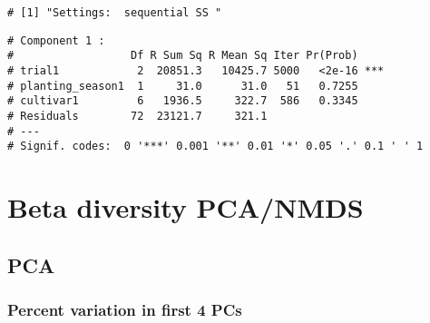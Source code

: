 \documentclass[
]{article}
\newenvironment{Shaded}{\begin{snugshade}}{\end{snugshade}}
\newcommand{\AttributeTok}[1]{\textcolor[rgb]{0.77,0.63,0.00}{#1}}
\newcommand{\CommentTok}[1]{\textcolor[rgb]{0.56,0.35,0.01}{\textit{#1}}}
\newcommand{\DecValTok}[1]{\textcolor[rgb]{0.00,0.00,0.81}{#1}}
\newcommand{\FunctionTok}[1]{\textcolor[rgb]{0.00,0.00,0.00}{#1}}
\newcommand{\NormalTok}[1]{#1}
\newcommand{\OtherTok}[1]{\textcolor[rgb]{0.56,0.35,0.01}{#1}}
\newcommand{\SpecialCharTok}[1]{\textcolor[rgb]{0.00,0.00,0.00}{#1}}
\newcommand{\StringTok}[1]{\textcolor[rgb]{0.31,0.60,0.02}{#1}}
\begin{document}
\begin{verbatim}
# [1] "Settings:  sequential SS "
\end{verbatim}

\begin{verbatim}
# Component 1 :
#                  Df R Sum Sq R Mean Sq Iter Pr(Prob)    
# trial1            2  20851.3   10425.7 5000   <2e-16 ***
# planting_season1  1     31.0      31.0   51   0.7255    
# cultivar1         6   1936.5     322.7  586   0.3345    
# Residuals        72  23121.7     321.1                  
# ---
# Signif. codes:  0 '***' 0.001 '**' 0.01 '*' 0.05 '.' 0.1 ' ' 1
\end{verbatim}

\hypertarget{beta-diversity-pcanmds-1}{%
\section{Beta diversity PCA/NMDS}\label{beta-diversity-pcanmds-1}}

\hypertarget{pca-1}{%
\subsection{PCA}\label{pca-1}}

\begin{Shaded}
\end{Shaded}

\hypertarget{percent-variation-in-first-4-pcs-1}{%
\subsubsection{Percent variation in first 4
PCs}\label{percent-variation-in-first-4-pcs-1}}

\begin{Shaded}
\end{Shaded}
\end{document}
